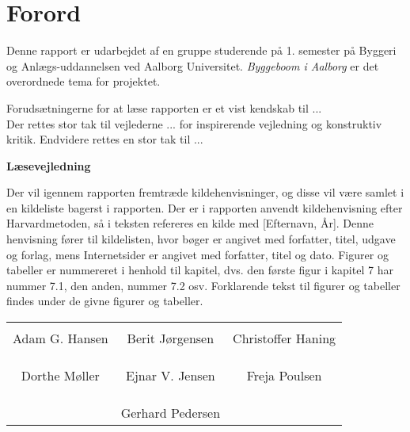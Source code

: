 \chapter*{Forord}

Denne rapport er udarbejdet af en gruppe studerende på 1. semester på Byggeri og Anlægs-uddannelsen ved Aalborg Universitet. \textit{Byggeboom i Aalborg} er det overordnede tema for projektet.

Forudsætningerne for at læse rapporten er et vist kendskab til ... \\
Der rettes stor tak til vejlederne ... for inspirerende vejledning og konstruktiv kritik. Endvidere rettes en stor tak til ...

\textbf{Læsevejledning}

Der vil igennem rapporten fremtræde kildehenvisninger, og disse vil være samlet i en kildeliste bagerst i rapporten. Der er i rapporten anvendt kildehenvisning efter Harvardmetoden, så i teksten refereres en kilde med [Efternavn, År]. Denne henvisning fører til kildelisten, hvor bøger er angivet med forfatter, titel, udgave og forlag, mens Internetsider er angivet med forfatter, titel og dato. Figurer og tabeller er nummereret i henhold til kapitel, dvs. den første figur i kapitel 7 har nummer 7.1, den anden, nummer 7.2 osv. Forklarende tekst til figurer og tabeller findes under de givne figurer og tabeller.

\phantom{Luft}

\phantom{Luft}

\begin{table}[H]
	\centering
		\begin{tabular}{c c c}
			\underline{\phantom{mmmmmmmmmmmmmm}} & \underline{\phantom{mmmmmmmmmmmmmm}} & \underline{\phantom{mmmmmmmmmmmmmm}} \\
			Adam  G. Hansen			& Berit Jørgensen 		& Christoffer Haning 			\\
			&&\\
			&&\\
			\underline{\phantom{mmmmmmmmmmmmmm}} & \underline{\phantom{mmmmmmmmmmmmmm}} & \underline{\phantom{mmmmmmmmmmmmmm}} \\
			Dorthe Møller			& Ejnar V. Jensen 		& Freja Poulsen 				\\
			&&\\
			&&\\
		 							& \underline{\phantom{mmmmmmmmmmmmmm}} 	&			\\														
									& Gerhard Pedersen 							& 												
		\end{tabular}
\end{table}